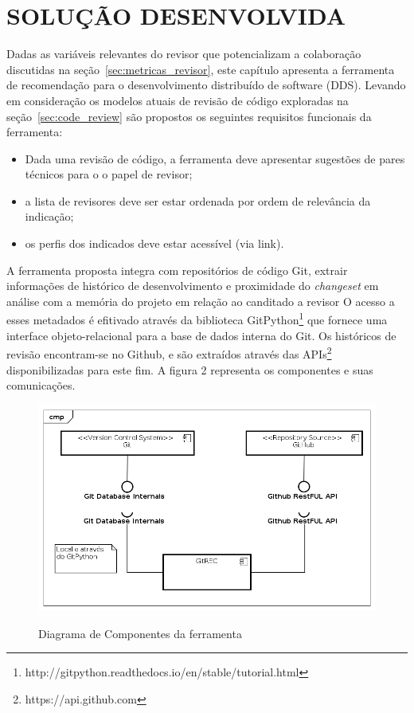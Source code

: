 \documentclass[preprint,review, 12pt]{elsarticle}
\begin{document}
\section{SOLUÇÃO DESENVOLVIDA}\label{chap:solucao}
    Dadas as variáveis relevantes do revisor que potencializam a colaboração discutidas na seção~\ref{sec:metricas_revisor}, este capítulo apresenta a ferramenta de recomendação para o desenvolvimento distribuído de software (DDS). Levando em consideração os modelos atuais de revisão de código exploradas na seção~\ref{sec:code_review} são propostos os seguintes requisitos funcionais da ferramenta:
		\begin{itemize}
			\item Dada uma revisão de código, a ferramenta deve apresentar sugestões de pares técnicos para o o papel de revisor;
			\item a lista de revisores deve ser estar ordenada por ordem de relevância da indicação;
			\item os perfis dos indicados deve estar acessível (via link).
		\end{itemize}

		A ferramenta proposta integra com repositórios de código Git, extrair informações de histórico de desenvolvimento e proximidade do \textit{changeset} em análise com a memória do projeto em relação ao canditado a revisor O acesso a esses metadados é efitivado através da biblioteca GitPython\footnote{http://gitpython.readthedocs.io/en/stable/tutorial.html} que fornece uma interface objeto-relacional para a base de dados interna do Git. Os históricos de revisão encontram-se no Github, e são extraídos através das APIs\footnote{https://api.github.com} disponibilizadas para este fim. A figura 2 representa os componentes e suas comunicações.

		\begin{figure}[!htbp]
		 \includegraphics[width=\textwidth]{diagrama_componentes}\label{fig:diagrama_componentes}
		 \caption{Diagrama de Componentes da ferramenta}
	 \end{figure}
\end{document}
